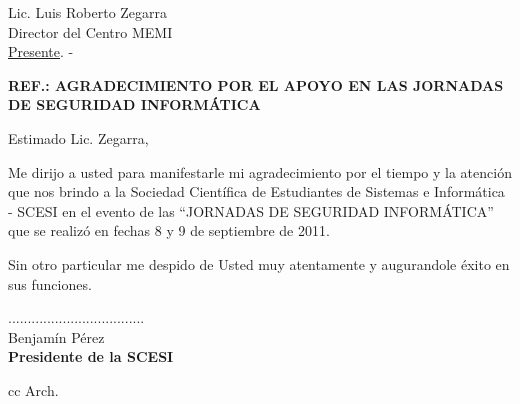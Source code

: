 \documentclass[letterpaper,12pt]{letter}
\begin{document}
\date {18 de octubre de 2011}

\begin{letter}{Lic. Luis Roberto Zegarra \\ Director del Centro MEMI \\ \underline {Presente}. -}

\begin{center}
	\opening{\textbf{REF.: AGRADECIMIENTO POR EL APOYO EN LAS JORNADAS DE SEGURIDAD INFORM\'ATICA}}
\end{center}

Estimado Lic. Zegarra,

Me dirijo a usted para manifestarle mi agradecimiento por el tiempo y la atención que nos brindo a la
Sociedad Cient\'ifica de Estudiantes de Sistemas e Inform\'atica - SCESI en el evento de las ``JORNADAS DE 
SEGURIDAD INFORMÁTICA'' que se realiz\'o en fechas 8 y 9 de septiembre de 2011.
 
Sin otro particular me despido de Usted muy atentamente y augurandole \'exito en sus funciones.

\vspace{4cm}

\begin{center}
...................................\\
Benjam\'in P\'erez\\
{\bfseries Presidente de la  SCESI}
\end{center}
\vspace{2cm}
cc Arch.
\end{letter}
\end{document}
